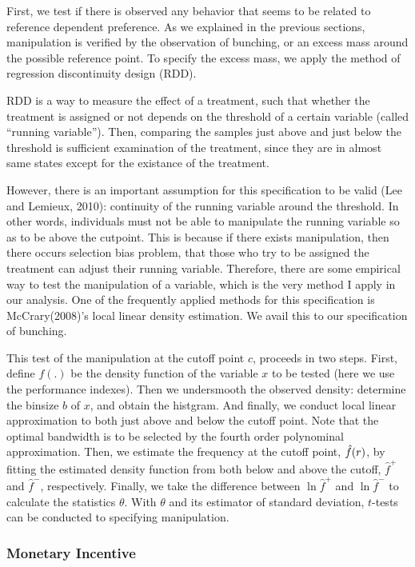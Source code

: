 \documentclass[dvipdfmx, 12pt]{article}
\begin{document}
  First, we test if there is observed any behavior that seems to be related to reference dependent preference. As we explained in the previous sections, manipulation is verified by the observation of bunching, or an excess mass around the possible reference point. To specify the excess mass, we apply the method of regression discontinuity design (RDD).

  RDD is a way to measure the effect of a treatment, such that whether the treatment is assigned or not depends on the threshold of a certain variable (called ``running variable''). Then, comparing the samples just above and just below the threshold is sufficient examination of the treatment, since they are in almost same states except for the existance of the treatment.

  However, there is an important assumption for this specification to be valid (Lee and Lemieux, 2010): continuity of the running variable around the threshold. In other words, individuals must not be able to manipulate the running variable so as to be above the cutpoint. This is because if there exists manipulation, then there occurs selection bias problem, that those who try to be assigned the treatment can adjust their running variable. Therefore, there are some empirical way to test the manipulation of a variable, which is the very method I apply in our analysis. One of the frequently applied methods for this specification is  McCrary(2008)'s local linear density estimation. We avail this to our specification of bunching.

  This test of the manipulation at the cutoff point $c$, proceeds in two steps. First, define $f(.)$ be the density function of the variable $x$ to be tested (here we use the performance indexes). Then we undersmooth the observed density: determine the binsize $b$ of $x$, and obtain the histgram. And finally, we conduct local linear approximation to both just above and below the cutoff point. Note that the optimal bandwidth is to be selected by the fourth order polynominal approximation. Then, we estimate the frequency at the cutoff point, $\Hat{f}(r)$, by fitting the estimated density function from both below and above the cutoff, $\hat{f}^+$ and $\hat{f}^-$, respectively. Finally, we take the difference between $\ln \hat{f}^+$ and $\ln \hat{f}^-$ to calculate the statistics $\theta$. With $\theta$ and its estimator of standard deviation, $t$-tests can be conducted to specifying manipulation.

  \subsubsection{Monetary Incentive}
\end{document}
